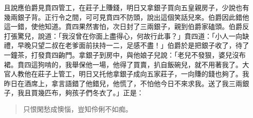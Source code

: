 且說應伯爵見賁四管工，在莊子上賺錢，明日又拿銀子買向五皇親房子，少說也有幾兩銀子背。正行令之間，可可見賁四不防頭，說出這個笑話兒來。伯爵因此錯他這一錯，使他知道。賁四果然害怕，次日封了三兩銀子，親到伯爵家磕頭。伯爵反打張驚兒，說道：「我沒曾在你面上盡得心，何故行此事？」賁四道：「小人一向缺禮，早晚只望二叔在老爹面前扶持一二，足感不盡！」伯爵於是把銀子收了，待了一鐘茶，打發賁四齣門。拿銀子到房中，與他娘子兒說：「老兒不發狠，婆兒沒布裙。賁四這狗啃的，我舉保他一場，他得了買賣，扒自飯碗兒，就不用著我了。大官人教他在莊子上管工，明日又托他拿銀子成向五家莊子，一向賺的錢也夠了。我昨日在酒席上，拿言語錯了他錯兒，他慌了，不怕他今日不來求我。送了我三兩銀子，我且買幾匹布，夠孩子們冬衣了。」正是：
\begin{quote}
只恨閑愁成懊惱，豈知伶俐不如痴。
\end{quote}
